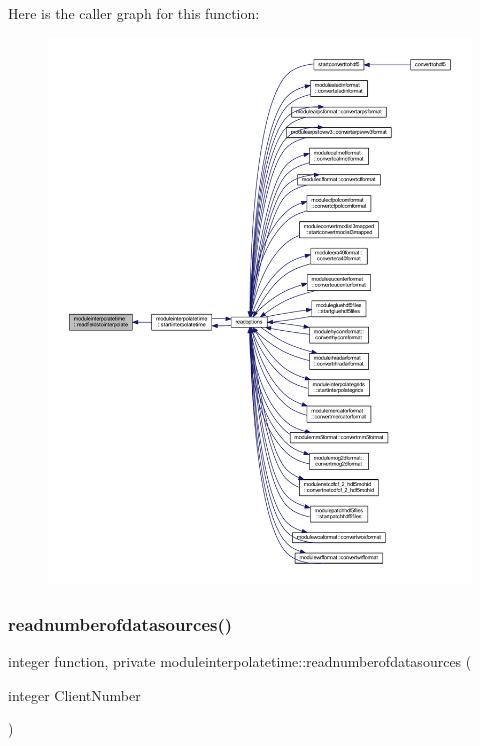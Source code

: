 Here is the caller graph for this function\+:\nopagebreak
\begin{figure}[H]
\begin{center}
\leavevmode
\includegraphics[width=350pt]{namespacemoduleinterpolatetime_a75df12a5adb5a489b09f35e20b069242_icgraph}
\end{center}
\end{figure}
\mbox{\label{namespacemoduleinterpolatetime_ad3414b04b75a8f0e9e8aaf053859dc2e}} 
\subsubsection{\texorpdfstring{readnumberofdatasources()}{readnumberofdatasources()}}
{\footnotesize\ttfamily integer function, private moduleinterpolatetime\+::readnumberofdatasources (\begin{DoxyParamCaption}\item[{integer}]{Client\+Number }\end{DoxyParamCaption})\hspace{0.3cm}{\ttfamily [private]}}

